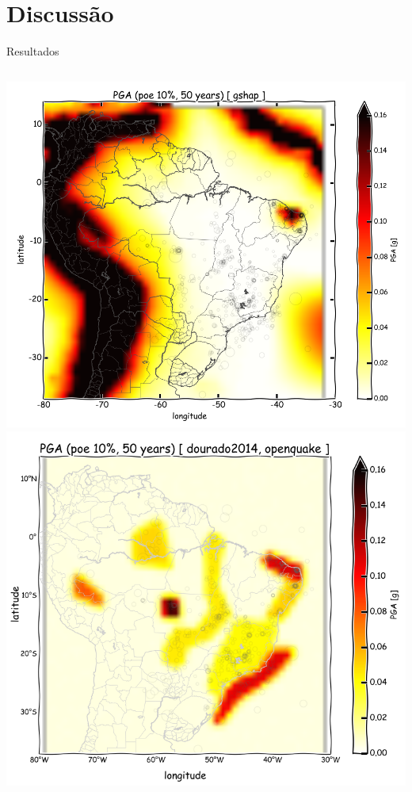 \documentclass[ucs,8pt]{beamer}
\begin{document}
\section{Discussão}
\begin{frame}{Resultados}

\begin{columns}
	\begin{column}[T]{.24\textwidth}
		\includegraphics[width=1\textwidth]{pga_gshap} \\
		\includegraphics[width=1\textwidth]{pga_dourado_oq}
	\end{column}
	

\end{columns}
\end{frame}
\end{document}

